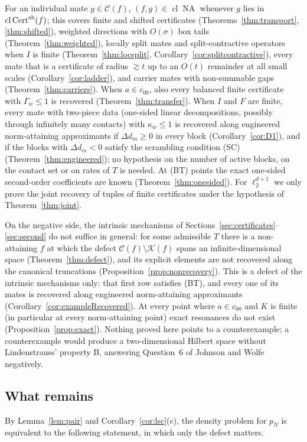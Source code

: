 \documentclass[10pt]{amsart}
\theoremstyle{definition}
\theoremstyle{remark}
\newcommand{\NA}{\operatorname{NA}}
\newcommand{\Cset}{\mathcal C}
\newcommand{\Cert}{\operatorname{Cert}}
\newcommand{\cl}{\operatorname{cl}}
\begin{document}
For an individual mate $g\in\Cset(f)$, $(f,g)\in\cl\NA$ whenever $g$ lies
in $\cl\Cert^{\rm sh}(f)$; this covers finite and shifted certificates
(Theorems~\ref{thm:transport}, \ref{thm:shifted}), weighted directions with
$O(\sigma)$ box tails (Theorem~\ref{thm:weighted}), locally split mates and
split-contractive operators when $I$ is finite (Theorem~\ref{thm:locsplit},
Corollary~\ref{cor:splitcontractive}), every mate that is a certificate of
radius $\gtrsim t$ up to an $O(t)$ remainder at all small scales
(Corollary~\ref{cor:ladder}), and carrier mates with non-summable gaps
(Theorem~\ref{thm:carriers}).  When $a\in c_{00}$, also every balanced
finite certificate with $\Gamma_w\le1$ is recovered
(Theorem~\ref{thm:transfer}).  When $I$ and $F$ are finite, every mate with
two-piece data (one-sided linear decompositions, possibly through infinitely
many contacts) with $\kappa_w\le1$ is recovered along engineered
norm-attaining approximants if $\Delta d_m\ge0$ in every block
(Corollary~\ref{cor:D1}), and if the blocks with $\Delta d_m<0$ satisfy the
scrambling condition \textup{(SC)} (Theorem~\ref{thm:engineered}); no
hypothesis on the number of active blocks, on the contact set or on rates of
$T$ is needed.  At \textup{(BT)} points the exact one-sided second-order
coefficients are known (Theorem~\ref{thm:onesided}).  For $\ell_2^{d+1}$ we
only prove the joint recovery of tuples of finite certificates under the
hypothesis of Theorem~\ref{thm:joint}.

On the negative side, the intrinsic mechanisms of
Sections~\ref{sec:certificates}--\ref{sec:second} do not suffice in general:
for some admissible $T$ there is a non-attaining $f$ at which the defect
$\Cset(f)\setminus\mathcal K(f)$ spans an infinite-dimensional space
(Theorem~\ref{thm:defect}), and its explicit elements are not recovered
along the canonical truncations (Proposition~\ref{prop:nonrecovery}).  This
is a defect of the intrinsic mechanisms only: that first row satisfies
\textup{(BT)}, and every one of its mates is recovered along engineered
norm-attaining approximants (Corollary~\ref{cor:exampleRecovered}).  At
every point where $a\in c_{00}$ and $K$ is finite (in particular at every
norm-attaining point) exact resonances do not exist
(Proposition~\ref{prop:exact}).  Nothing proved here points to a
counterexample; a counterexample would produce a two-dimensional Hilbert
space without Lindenstrauss' property B, answering Question~6 of Johnson and
Wolfe \cite{JW} negatively.

\subsection{What remains}
By Lemma~\ref{lem:pair} and Corollary~\ref{cor:lsc}(c), the density problem
for $p_N$ is equivalent to the following statement, in which only the defect
matters.
\end{document}
